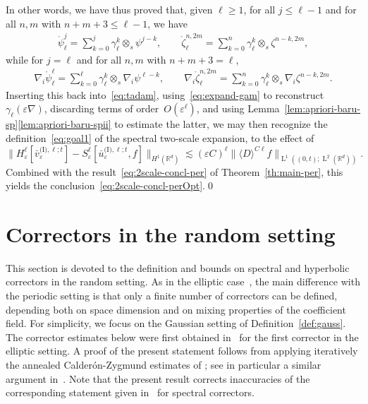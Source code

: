 \documentclass[10pt]{amsart}
\theoremstyle{plain}
\theoremstyle{definition}
\numberwithin{equation}{section}
\newcommand{\e}{\varepsilon}
\newcommand{\R}{\mathbb R}
\newcommand{\Ld}{\operatorname{L}}
\begin{document}
{In other words, we have thus proved that, given $\ell\geq1$, for all $j\le\ell-1$ and for all $n,m$ with $n+m+3\le\ell-1$, we have\vspace*{-3pt}
\begin{align*}
\mathring\psi_\ell^j=\sum_{k=0}^j\gamma_\ell^k\otimes_s\psi^{j-k},\qquad \mathring\zeta_\ell^{n,2m}=\sum_{k=0}^n\gamma_\ell^k\otimes_s\zeta^{n-k,2m},
\end{align*}
while for $j=\ell$ and for all $n,m$ with $n+m+3=\ell$,\vspace*{-3pt}
\begin{align*}
\nabla_i\mathring\psi_\ell^{\ell}=\sum_{k=0}^{\ell}\gamma_\ell^k\otimes_s\nabla_i\psi^{\ell-k},\qquad \nabla_i\mathring\zeta_\ell^{n,2m}=\sum_{k=0}^n\gamma_\ell^k\otimes_s\nabla_i\zeta^{n-k,2m}.
\end{align*}
Inserting this back into~\eqref{eq:tadam}, using~\eqref{eq:expand-gam} to reconstruct $\gamma_\ell(\e\nabla)$, discarding terms of order~$O(\e^\ell)$, and using Lemma~\ref{lem:apriori-baru-sp}\eqref{lem:apriori-baru-spii} to estimate the latter,
we may then recognize the definition~\eqref{eq:goal1} of the spectral two-scale expansion, to the effect of\vspace*{-3pt}
\begin{equation*}
\|H^\ell_\e[\bar v_\e^{\text{(I)},\ell;t}]
-S_\e^\ell[\bar u_\e^{\text{(I)},\ell;t},f]\|_{H^1(\R^d)}
\lesssim
(\e C)^{\ell}\|\langle D\rangle^{C\ell}f\|_{\Ld^1((0,t);\Ld^2(\R^d))}.
\end{equation*}
Combined} with the result~\eqref{eq:2scale-concl-per} of Theorem~\ref{th:main-per}, this yields the conclusion~\eqref{eq:2scale-concl-perOpt}.\qed

\appendix
\section{Correctors in the random setting}\label{sec:rand-cor}

This section is devoted to the definition and bounds on spectral and hyperbolic correctors in the random setting.
As in the elliptic case~\cite{GNO-quant,AKM-book,Gu-17,DO1}, the main difference with the periodic setting is that only a finite number of correctors can be defined, depending both on space dimension and on mixing properties of the coefficient field.
For simplicity, we focus on the Gaussian setting of Definition~\ref{def:gauss}.
The corrector estimates below were first obtained in~\cite{GO1,Gloria-Otto-10b,GNO-quant} for the first corrector in the elliptic setting.
A proof of the present statement follows from applying iteratively the annealed Calder\'on-Zygmund estimates of \cite{DO1,DFG-22}; see in particular a similar argu\-ment in~\cite[Proof of Prop.\,2.2]{DO1}. Note that the present result corrects inaccuracies of the corresponding statement given in~\cite[Prop.\,C.4]{BG} for spectral correctors.
\end{document}
